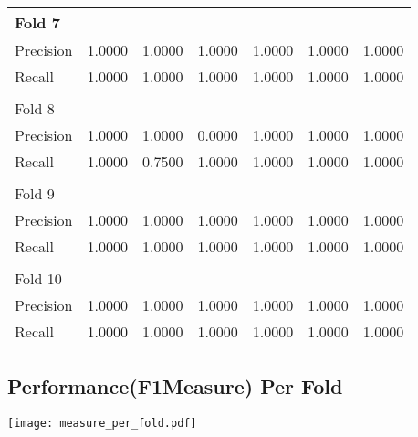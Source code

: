 \documentclass[a4paper,11pt]{article}
\begin{document}
\begin{center}
\begin{tabular}{| l | c | c | c | c | c | c |}
    Fold 7 &&&&&& \\ \hline
    Precision & 1.0000 & 1.0000 & 1.0000 & 1.0000 & 1.0000 & 1.0000 \\ \hline
    Recall & 1.0000 & 1.0000 & 1.0000 & 1.0000 & 1.0000 & 1.0000 \\ \hline
    &&&&&& \\ \hline
    Fold 8 &&&&&& \\ \hline
    Precision & 1.0000 & 1.0000 & 0.0000 & 1.0000 & 1.0000 & 1.0000 \\ \hline
    Recall & 1.0000 & 0.7500 & 1.0000 & 1.0000 & 1.0000 & 1.0000 \\ \hline
    &&&&&& \\ \hline
    Fold 9 &&&&&& \\ \hline
    Precision & 1.0000 & 1.0000 & 1.0000 & 1.0000 & 1.0000 & 1.0000 \\ \hline
    Recall & 1.0000 & 1.0000 & 1.0000 & 1.0000 & 1.0000 & 1.0000 \\ \hline
    &&&&&& \\ \hline
    Fold 10 &&&&&& \\ \hline
    Precision & 1.0000 & 1.0000 & 1.0000 & 1.0000 & 1.0000 & 1.0000 \\ \hline
    Recall & 1.0000 & 1.0000 & 1.0000 & 1.0000 & 1.0000 & 1.0000 \\ \hline
\end{tabular}
\end{center}
\subsection{Performance(F1Measure) Per Fold}

\begin{center}
    \texttt{[image: measure\_per\_fold.pdf]}
\end{center}
\end{document}
